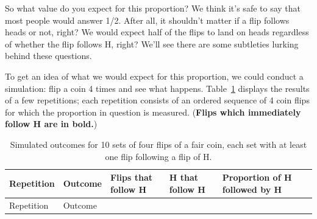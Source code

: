 \documentclass[
  letterpaper,
  DIV=11,
  numbers=noendperiod]{scrreprt}
\theoremstyle{plain}
\theoremstyle{definition}
\theoremstyle{definition}
\theoremstyle{definition}
\theoremstyle{remark}
\begin{document}
So what value do you expect for this proportion? We think it's safe to
say that most people would answer 1/2. After all, it shouldn't matter if
a flip follows heads or not, right? We would expect half of the flips to
land on heads regardless of whether the flip follows H, right? We'll see
there are some subtleties lurking behind these questions.

To get an idea of what we would expect for this proportion, we could
conduct a simulation: flip a coin 4 times and see what happens.
Table~\ref{tbl-mscoin-intro} displays the results of a few repetitions;
each repetition consists of an ordered sequence of 4 coin flips for
which the proportion in question is measured. (\textbf{Flips which
immediately follow H are in bold.})

\begin{longtable}[]{@{}
  >{\raggedleft\arraybackslash}p{}
  >{\raggedleft\arraybackslash}p{}
  >{\raggedright\arraybackslash}p{}
  >{\raggedright\arraybackslash}p{}
  >{\raggedleft\arraybackslash}p{}@{}}
\caption{Simulated outcomes for 10 sets of four flips of a fair coin,
each set with at least one flip following a flip of
H.}\label{tbl-mscoin-intro}\tabularnewline
\toprule\noalign{}
\begin{minipage}[b]{\linewidth}\raggedleft
Repetition
\end{minipage} & \begin{minipage}[b]{\linewidth}\raggedleft
Outcome
\end{minipage} & \begin{minipage}[b]{\linewidth}\raggedright
Flips that follow H
\end{minipage} & \begin{minipage}[b]{\linewidth}\raggedright
H that follow H
\end{minipage} & \begin{minipage}[b]{\linewidth}\raggedleft
Proportion of H followed by H
\end{minipage} \\
\midrule\noalign{}
\endfirsthead
\toprule\noalign{}
\begin{minipage}[b]{\linewidth}\raggedleft
Repetition
\end{minipage} & \begin{minipage}[b]{\linewidth}\raggedleft
Outcome
\end{minipage} & \begin{minipage}[b]{\linewidth}\raggedright

\end{minipage}
\end{longtable}
\end{document}
